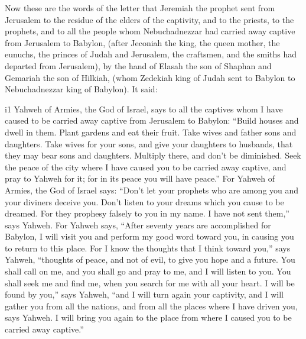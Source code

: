  Now these are the words of the letter that Jeremiah the
prophet sent from Jerusalem to the residue of the elders of the
captivity, and to the priests, to the prophets, and to all the people
whom Nebuchadnezzar had carried away captive from Jerusalem to Babylon,
 (after Jeconiah the king, the queen mother, the eunuchs,
the princes of Judah and Jerusalem, the craftsmen, and the smiths had
departed from Jerusalem),  by the hand of Elasah the son
of Shaphan and Gemariah the son of Hilkiah, (whom Zedekiah king of Judah
sent to Babylon to Nebuchadnezzar king of Babylon). It said:

i1 Yahweh of Armies, the God of Israel, says to all the
captives whom I have caused to be carried away captive from Jerusalem to
Babylon:  ``Build houses and dwell in them. Plant gardens
and eat their fruit.  Take wives and father sons and
daughters. Take wives for your sons, and give your daughters to
husbands, that they may bear sons and daughters. Multiply there, and
don't be diminished.  Seek the peace of the city where I
have caused you to be carried away captive, and pray to Yahweh for it;
for in its peace you will have peace.''  For Yahweh of
Armies, the God of Israel says: ``Don't let your prophets who are among
you and your diviners deceive you. Don't listen to your dreams which you
cause to be dreamed.  For they prophesy falsely to you in
my name. I have not sent them,'' says Yahweh.  For Yahweh
says, ``After seventy years are accomplished for Babylon, I will visit
you and perform my good word toward you, in causing you to return to
this place.  For I know the thoughts that I think toward
you,'' says Yahweh, ``thoughts of peace, and not of evil, to give you
hope and a future.  You shall call on me, and you shall
go and pray to me, and I will listen to you.  You shall
seek me and find me, when you search for me with all your heart.
 I will be found by you,'' says Yahweh, ``and I will turn
again your captivity, and I will gather you from all the nations, and
from all the places where I have driven you, says Yahweh. I will bring
you again to the place from where I caused you to be carried away
captive.''

